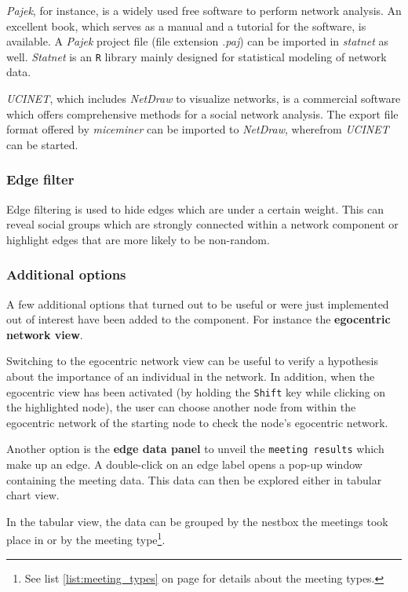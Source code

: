\textit{Pajek}\citep{pajek}, for instance, is a widely used free software to perform network analysis. An excellent book\citep{pajek:03}, which serves as a manual and a tutorial for the software, is available. A \textit{Pajek} project file (file extension \textit{.paj}) can be imported in \textit{statnet}\citep{statnet:03} as well. \textit{Statnet} is an \lstinline|R|\citep{r:05} library mainly designed for statistical modeling of network data.

\textit{UCINET}\citep{ucinet:99}, which includes \textit{NetDraw} to visualize networks, is a commercial software which offers comprehensive methods for a social network analysis. The export file format offered by \textit{miceminer} can be imported to \textit{NetDraw}, wherefrom \textit{UCINET} can be started.

\subsubsection*{Edge filter}

Edge filtering is used to hide edges which are under a certain weight. This can reveal social groups which are strongly connected within a network component or highlight edges that are more likely to be non-random.

\subsubsection*{Additional options}

A few additional options that turned out to be useful or were just implemented out of interest have been added to the component. For instance the \textbf{egocentric network view}. 

Switching to the egocentric network view can be useful to verify a hypothesis about the importance of an individual in the network. In addition, when the egocentric view has been activated (by holding the \lstinline|Shift| key while clicking on the highlighted node), the user can choose another node from within the egocentric network of the starting node to check the node's egocentric network.

Another option is the \textbf{edge data panel} to unveil the \lstinline|meeting results| which make up an edge. A double-click on an edge label opens a pop-up window containing the meeting data. This data can then be explored either in tabular chart view.

In the tabular view, the data can be grouped by the nestbox the meetings took place in or by the meeting type\footnote{See list \ref{list:meeting_types} on page \pageref{list:meeting_types} for details about the meeting types.}.

